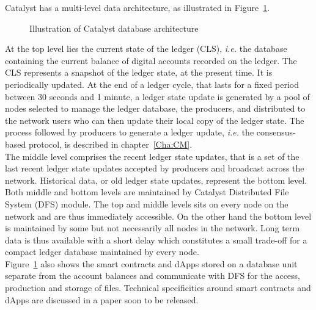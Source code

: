  Catalyst has a multi-level data architecture, as illustrated in Figure~\ref{fig:db}. 

\begin{figure}[H]
\label{fig:db}
\caption{\label{fig:db} Illustration of Catalyst database architecture}
\end{figure}

At the top level lies the current state of the ledger (CLS), \textit{i.e.} the database containing the current balance of digital accounts recorded on the ledger. The CLS represents a snapshot of the ledger state, at the present time. It is periodically updated. At the end of a ledger cycle, that lasts for a fixed period between 30 seconds and 1 minute, a ledger state update is generated by a pool of nodes selected to manage the ledger database, the producers, and distributed to the network users who can then update their local copy of the ledger state. The process followed by producers to generate a ledger update, \textit{i.e.} the consensus-based protocol, is described in chapter~\ref{Cha:CM}.\\

The middle level comprises the recent ledger state updates, that is a set of the last recent ledger state updates accepted by producers and broadcast across the network. Historical data, or old ledger state updates, represent the bottom level. Both middle and bottom levels are maintained by Catalyst Distributed File System (DFS) module. The top and middle levels sits on every node on the network and are thus immediately accessible. On the other hand the bottom level is maintained by some but not necessarily all nodes in the network. Long term data is thus available with a short delay which constitutes a small trade-off for a compact ledger database maintained by every node.\\

Figure~\ref{fig:db} also shows the smart contracts and dApps  stored on a database unit separate from the account balances and communicate with DFS for the access, production and storage of files. Technical specificities around smart contracts and dApps are discussed in a paper soon to be released.  

